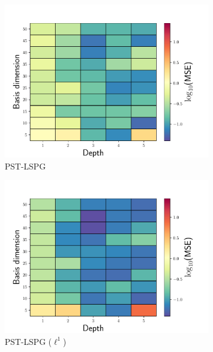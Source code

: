 \documentclass[3p,computermodern,10pt]{elsarticle}
\begin{document}
\begin{figure}
\begin{center}
\begin{subfigure}[t]{0.32\textwidth}
\includegraphics[trim={0cm 0cm 0cm 0cm},clip,width=1.0\linewidth]{code/burgers/synapse_models/basis_study/results/MSE_LS.pdf}
\caption{PST-LSPG}
\end{subfigure}
\begin{subfigure}[t]{0.32\textwidth}
\includegraphics[trim={0cm 0cm 0cm 0cm},clip,width=1.0\linewidth]{code/burgers/synapse_models/basis_study/results/MSE_L1.pdf}
\caption{PST-LSPG ($\ell^1$)}
\end{subfigure}
\begin{subfigure}[t]{0.32\textwidth}

\end{subfigure}
\end{center}
\end{figure}
\end{document}
